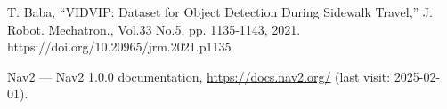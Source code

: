 \documentclass[twocolumn,9pt]{jsproceedings}
\begin{document}
\begin{thebibliography}{99}

  
  T. Baba, “VIDVIP: Dataset for Object Detection During Sidewalk Travel,” J. Robot. Mechatron., Vol.33 No.5, pp. 1135-1143, 2021. https://doi.org/10.20965/jrm.2021.p1135
  
  Nav2 — Nav2 1.0.0 documentation, \url{https://docs.nav2.org/} (last visit: 2025-02-01).
\end{thebibliography}
\normalsize

\clearpage

\end{document}
